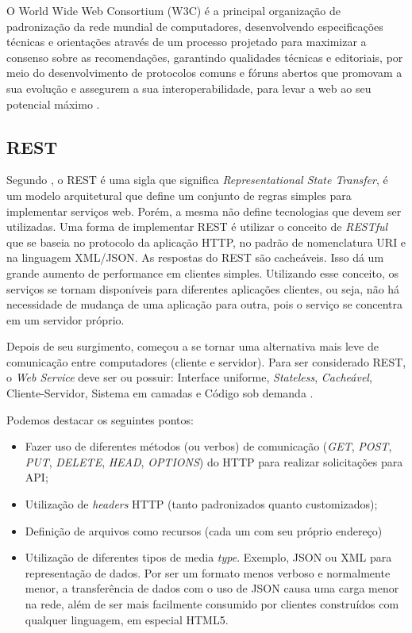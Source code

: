 O World Wide Web Consortium (W3C) é a principal organização de padronização da rede mundial de computadores, desenvolvendo especificações técnicas e orientações através de um processo projetado para maximizar a consenso sobre as recomendações, garantindo qualidades técnicas e editoriais, por meio do desenvolvimento de protocolos comuns e fóruns abertos que promovam a sua evolução e assegurem a sua interoperabilidade, para levar a web ao seu potencial máximo \cite{api:w3c}.

\subsection{REST}
Segundo , o REST é uma sigla que significa \textit{Representational State Transfer}, é um modelo arquitetural que define um conjunto de regras simples para implementar serviços web. Porém, a mesma não define tecnologias que devem ser utilizadas. Uma forma de implementar REST é utilizar o conceito de \textit{RESTful} que se baseia no protocolo da aplicação HTTP, no padrão de nomenclatura URI e na linguagem XML/JSON. As respostas do REST são cacheáveis. Isso dá um grande aumento de performance em clientes simples. Utilizando esse conceito, os serviços se tornam disponíveis para diferentes aplicações clientes, ou seja, não há necessidade de mudança de uma aplicação para outra, pois o serviço se concentra em um servidor próprio. 

Depois de seu surgimento, começou a se tornar uma alternativa mais leve de comunicação entre computadores (cliente e servidor). Para ser considerado REST, o \textit{Web Service} deve ser ou possuir: Interface uniforme, \textit{Stateless}, \textit{Cacheável}, Cliente-Servidor, Sistema em camadas e Código sob demanda \cite{rest:roy}. 

Podemos destacar os seguintes pontos:
\begin{itemize}
    \item Fazer uso de diferentes métodos (ou verbos) de comunicação (\textit{GET}, \textit{POST}, \textit{PUT}, \textit{DELETE}, \textit{HEAD}, \textit{OPTIONS}) do HTTP para realizar solicitações para API; 
    \item Utilização de \textit{headers} HTTP (tanto padronizados quanto customizados); 
    \item Definição de arquivos como recursos (cada um com seu próprio endereço)
    \item Utilização de diferentes tipos de media \textit{type}. Exemplo, JSON ou XML para representação de dados. Por ser um formato menos verboso e normalmente menor, a transferência de dados com o uso de JSON causa uma carga menor na rede, além de ser mais facilmente consumido por clientes construídos com qualquer linguagem, em especial HTML5.
\end{itemize}


